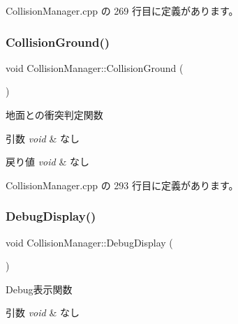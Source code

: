  Collision\+Manager.\+cpp の 269 行目に定義があります。

\mbox{\label{class_collision_manager_a1d67f4076eb71e191db5cff4e5abe3b0}} 
\subsubsection{\texorpdfstring{Collision\+Ground()}{CollisionGround()}}
{\footnotesize\ttfamily void Collision\+Manager\+::\+Collision\+Ground (\begin{DoxyParamCaption}{ }\end{DoxyParamCaption})\hspace{0.3cm}{\ttfamily [private]}}



地面との衝突判定関数 


\begin{DoxyParams}{引数}
{\em void} & なし \\
\hline
\end{DoxyParams}

\begin{DoxyRetVals}{戻り値}
{\em void} & なし \\
\hline
\end{DoxyRetVals}


 Collision\+Manager.\+cpp の 293 行目に定義があります。

\mbox{\label{class_collision_manager_a4da1241f3905c3855b31d7e20ceed5a1}} 
\subsubsection{\texorpdfstring{Debug\+Display()}{DebugDisplay()}}
{\footnotesize\ttfamily void Collision\+Manager\+::\+Debug\+Display (\begin{DoxyParamCaption}{ }\end{DoxyParamCaption})\hspace{0.3cm}{\ttfamily [private]}}



Debug表示関数 


\begin{DoxyParams}{引数}
{\em void} & なし \\
\hline
\end{DoxyParams}

